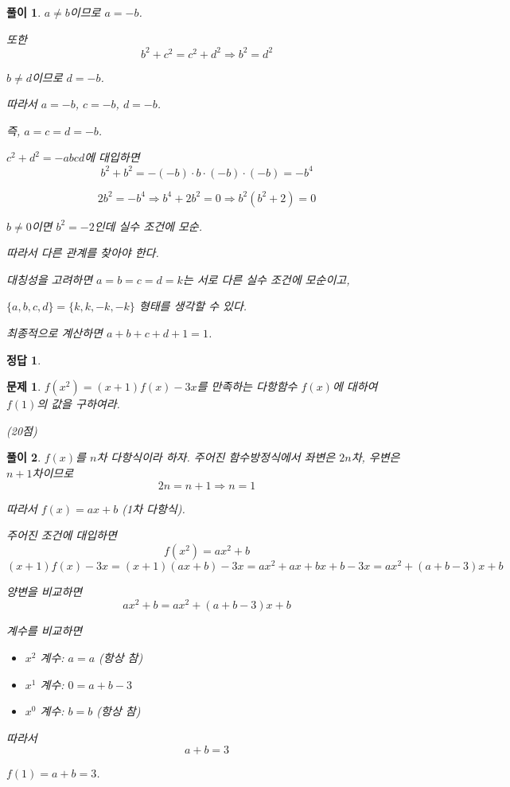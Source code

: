 \documentclass[12pt,a4paper]{article}
\theoremstyle{test_form}
\newtheorem{problem}{문제}[section]
\newtheorem*{solution}{풀이}
\newtheorem*{answer}{정답}
\begin{document}
\begin{solution}
\(a \neq b\)이므로 \(a = -b\).

또한
\[
b^2 + c^2 = c^2 + d^2 \Rightarrow b^2 = d^2
\]

\(b \neq d\)이므로 \(d = -b\).

따라서 \(a = -b\), \(c = -b\), \(d = -b\).

즉, \(a = c = d = -b\).

\(c^2 + d^2 = -abcd\)에 대입하면
\[
b^2 + b^2 = -(-b) \cdot b \cdot (-b) \cdot (-b) = -b^4
\]

\[
2b^2 = -b^4 \Rightarrow b^4 + 2b^2 = 0 \Rightarrow b^2(b^2 + 2) = 0
\]

\(b \neq 0\)이면 \(b^2 = -2\)인데 실수 조건에 모순.

따라서 다른 관계를 찾아야 한다.

대칭성을 고려하면 \(a = b = c = d = k\)는 서로 다른 실수 조건에 모순이고,

\(\{a, b, c, d\} = \{k, k, -k, -k\}\) 형태를 생각할 수 있다.

최종적으로 계산하면 \(a + b + c + d + 1 = 1\).

\end{solution}

\begin{answer}
\hfill {}
\end{answer}

\newpage

\begin{problem}

\(f(x^2) = (x+1)f(x) - 3x\)를 만족하는 다항함수 \(f(x)\)에 대하여 \(f(1)\)의 값을 구하여라.

\begin{flushright}(20점)\end{flushright}

\end{problem}

\begin{solution}

\setlength{\parindent}{0pt}

\(f(x)\)를 \(n\)차 다항식이라 하자. 주어진 함수방정식에서 좌변은 \(2n\)차, 우변은 \(n+1\)차이므로
\[
2n = n + 1 \Rightarrow n = 1
\]

따라서 \(f(x) = ax + b\) (1차 다항식).

주어진 조건에 대입하면
\[
f(x^2) = ax^2 + b
\]
\[
(x+1)f(x) - 3x = (x+1)(ax+b) - 3x = ax^2 + ax + bx + b - 3x = ax^2 + (a+b-3)x + b
\]

양변을 비교하면
\[
ax^2 + b = ax^2 + (a+b-3)x + b
\]

계수를 비교하면
\begin{itemize}
\item \(x^2\) 계수: \(a = a\) (항상 참)
\item \(x^1\) 계수: \(0 = a + b - 3\)
\item \(x^0\) 계수: \(b = b\) (항상 참)
\end{itemize}

따라서
\[
a + b = 3
\]

\(f(1) = a + b = 3\).

\end{solution}
\end{document}
